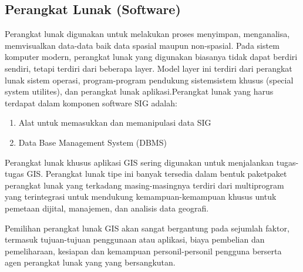 \subsection{Perangkat Lunak (Software)}
Perangkat lunak digunakan untuk melakukan proses menyimpan, menganalisa, memvisualkan data-data baik data spasial maupun non-spasial. Pada sistem komputer modern, perangkat lunak yang digunakan biasanya tidak dapat berdiri sendiri, tetapi terdiri dari beberapa layer. Model layer ini terdiri dari perangkat lunak sistem operasi, program-program pendukung sistemsistem khusus (special system utilites), dan perangkat lunak aplikasi.Perangkat lunak yang harus terdapat dalam komponen software SIG adalah:
\begin{enumerate}
\item Alat untuk memasukkan dan memanipulasi data SIG
\item Data Base Management System (DBMS)
\end{enumerate}

Perangkat lunak khusus aplikasi GIS sering digunakan untuk menjalankan tugas-tugas GIS. Perangkat lunak tipe ini banyak tersedia dalam bentuk paketpaket perangkat lunak yang terkadang masing-masingnya terdiri dari multiprogram yang terintegrasi untuk mendukung kemampuan-kemampuan khusus untuk pemetaan dijital, manajemen, dan analisis data geografi. 

Pemilihan perangkat lunak GIS akan sangat bergantung pada sejumlah faktor, termasuk tujuan-tujuan penggunaan atau aplikasi, biaya pembelian dan pemeliharaan, kesiapan dan kemampuan personil-personil pengguna berserta agen perangkat lunak yang yang bersangkutan. 

